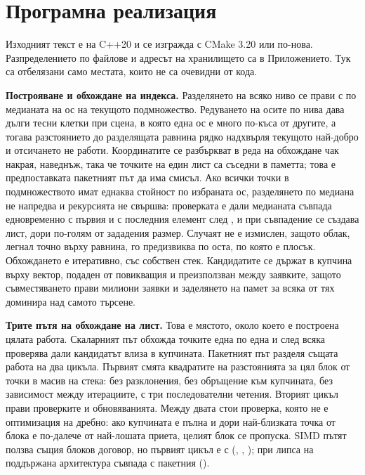 \section{Програмна реализация}
\label{sec:implementation}

Изходният текст е на C++20 и се изгражда с CMake 3.20 или по-нова. Разпределението по файлове
и адресът на хранилището са в Приложението. Тук са отбелязани само местата, които не са
очевидни от кода.

\textbf{Построяване и обхождане на индекса.} Разделянето на всяко ниво се прави с
 по медианата на  ос на текущото подмножество.
Редуването на осите по нива дава дълги тесни клетки при сцена, в която една ос е много по-къса
от другите, а тогава разстоянието до разделящата равнина рядко надхвърля текущото най-добро и
отсичането не работи. Координатите се разбъркват в реда на обхождане чак накрая, наведнъж, така
че точките на един лист са съседни в паметта; това е предпоставката пакетният път да има
смисъл. Ако всички точки в подмножеството имат еднаква стойност по избраната ос, разделянето по
медиана не напредва и рекурсията не свършва: проверката е дали медианата съвпада едновременно с
първия и с последния елемент след , и при съвпадение се създава лист, дори
по-голям от зададения размер. Случаят не е измислен, защото облак, легнал точно върху равнина,
го предизвиква по оста, по която е плосък. Обхождането е итеративно, със собствен стек. Кандидатите се
държат в купчина върху вектор, подаден от повикващия и преизползван между заявките, защото
съвместяването прави милиони заявки и заделянето на памет за всяка от тях доминира над самото
търсене.

\textbf{Трите пътя на обхождане на лист.} Това е мястото, около което е построена цялата
работа. Скаларният път обхожда точките една по една и след всяка проверява дали кандидатът
влиза в купчината. Пакетният път разделя същата работа на два цикъла. Първият смята квадратите
на разстоянията за цял блок от точки в масив на стека: без разклонения, без обръщение към
купчината, без зависимост между итерациите, с три последователни четения. Вторият цикъл прави
проверките и обновяванията. Между двата стои проверка, която не е оптимизация на дребно: ако
купчината е пълна и дори най-близката точка от блока е по-далече от най-лошата приета, целият
блок се пропуска. SIMD пътят ползва същия блоков договор, но първият цикъл е с
 (, , ); при липса на
поддържана архитектура съвпада с пакетния ().

